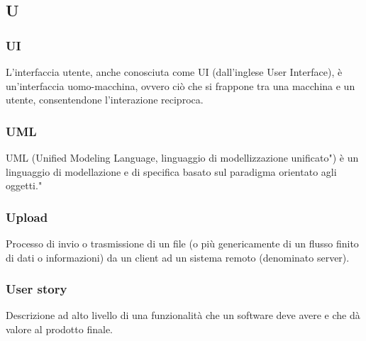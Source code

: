 \subsection*{\textbf{\hfill \Huge{U} \hfill}} 
\subsubsection*{UI}
L'interfaccia utente, anche conosciuta come UI (dall'inglese User Interface), è un'interfaccia uomo-macchina, ovvero ciò che si frappone tra una macchina e un utente, consentendone l'interazione reciproca.
\subsubsection*{UML}
UML (Unified Modeling Language, linguaggio di modellizzazione unificato") è un linguaggio di modellazione e di specifica basato sul paradigma orientato agli oggetti."
\subsubsection*{Upload}
Processo di invio o trasmissione di un file (o più genericamente di un flusso finito di dati o informazioni) da un client ad un sistema remoto (denominato server).
\subsubsection*{User story}
Descrizione ad alto livello di una funzionalità che un software deve avere e che dà valore al prodotto finale.
